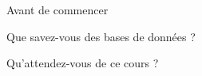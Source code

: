 \begin{frame}{Avant de commencer}

    Que savez-vous des bases de données ?

    Qu'attendez-vous de ce cours ?

\end{frame}

%
%
